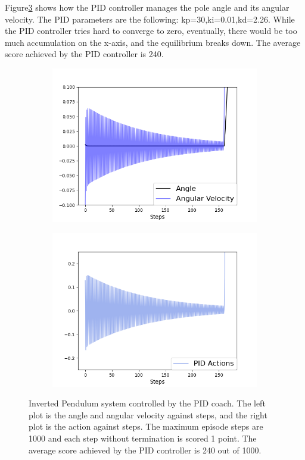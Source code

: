 \documentclass[smallextended]{svjour3}
\begin{document}
Figure\ref{fig:ip} shows how the PID controller manages the pole angle and its angular velocity. The PID parameters are the following: kp=30,ki=0.01,kd=2.26. While the PID controller tries hard to converge to zero, eventually, there would be too much accumulation on the x-axis, and the equilibrium breaks down. The average score achieved by the PID controller is 240.


\begin{figure}
\centering
\begin{subfigure}{0.5\textwidth}
  \centering
  \includegraphics[width=\linewidth]{ip_PID.png}
  \label{fig:ip_pid}
\end{subfigure}%
\begin{subfigure}{.5\textwidth}
  \centering
  \includegraphics[width=\linewidth]{ip_PID_actions.png}
  \label{fig:ip_pid_actions}
\end{subfigure}
\caption{Inverted Pendulum system controlled by the PID coach. The left plot is the angle and angular velocity against steps, and the right plot is the action against steps. The maximum episode steps are 1000 and each step without termination is scored 1 point. The average score achieved by the PID controller is 240 out of 1000.}
\label{fig:ip}
\end{figure}
\end{document}
